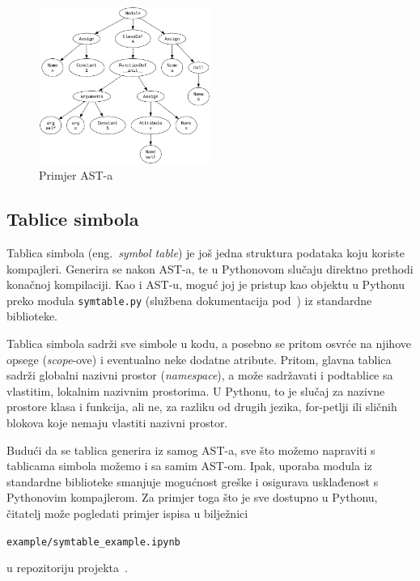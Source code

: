 \begin{figure}[hb]
    \centering
    \includegraphics[width=0.5\textwidth]{assets/ast-example.png}
    \caption{Primjer AST-a}
    \label{fig:ast-example}
\end{figure}

\subsection{Tablice simbola}
Tablica simbola (eng.\ \textsl{symbol table}) je još jedna struktura podataka koju koriste kompajleri. Generira se nakon AST-a, te u Pythonovom slučaju direktno prethodi konačnoj kompilaciji. Kao i AST-u, moguć joj
je pristup kao objektu u Pythonu preko modula \texttt{symtable.py} (službena dokumentacija pod~\cite{docs:symtable}) iz standardne biblioteke. 

Tablica simbola sadrži sve simbole u kodu, a posebno se pritom osvrće na njihove opsege (\emph{scope}-ove) i eventualno neke dodatne atribute. Pritom, glavna tablica sadrži globalni nazivni prostor (\emph{namespace}), 
a može sadržavati i podtablice sa vlastitim, lokalnim nazivnim prostorima. U Pythonu, to je slučaj za nazivne prostore klasa i funkcija, ali ne, za razliku od drugih jezika, for-petlji ili sličnih blokova koje nemaju vlastiti 
nazivni prostor.

Budući da se tablica generira iz samog AST-a, sve što možemo napraviti s tablicama simbola možemo i sa samim AST-om. Ipak, uporaba modula iz standardne biblioteke smanjuje mogućnost greške i osigurava usklađenost s
Pythonovim kompajlerom. Za primjer toga što je sve dostupno u Pythonu, čitatelj može pogledati primjer ispisa u bilježnici
\begin{center}
\texttt{example/symtable_example.ipynb}
\end{center}
u repozitoriju projekta~\cite{repo}.


